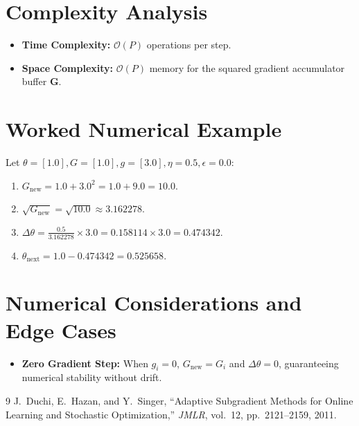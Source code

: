 \documentclass[11pt]{article}
\begin{document}
\section{Complexity Analysis}
\label{sec:complexity}

\begin{itemize}
    \item \textbf{Time Complexity:} $\mathcal{O}(P)$ operations per step.
    \item \textbf{Space Complexity:} $\mathcal{O}(P)$ memory for the squared gradient accumulator buffer $\mathbf{G}$.
\end{itemize}

\section{Worked Numerical Example}
\label{sec:worked_example}

Let $\theta = [1.0], G = [1.0], g = [3.0], \eta = 0.5, \epsilon = 0.0$:
\begin{enumerate}
    \item $G_{\mathrm{new}} = 1.0 + 3.0^2 = 1.0 + 9.0 = 10.0$.
    \item $\sqrt{G_{\mathrm{new}}} = \sqrt{10.0} \approx 3.162278$.
    \item $\Delta\theta = \frac{0.5}{3.162278} \times 3.0 = 0.158114 \times 3.0 = 0.474342$.
    \item $\theta_{\mathrm{next}} = 1.0 - 0.474342 = 0.525658$.
\end{enumerate}

\section{Numerical Considerations and Edge Cases}
\label{sec:numerical}

\begin{itemize}
    \item \textbf{Zero Gradient Step:} When $g_i = 0$, $G_{\mathrm{new}} = G_i$ and $\Delta\theta = 0$, guaranteeing numerical stability without drift.
\end{itemize}

\begin{thebibliography}{9}
 J.~Duchi, E.~Hazan, and Y.~Singer, ``Adaptive Subgradient Methods for Online Learning and Stochastic Optimization,'' \emph{JMLR}, vol.~12, pp.~2121--2159, 2011.
\end{thebibliography}
\end{document}
